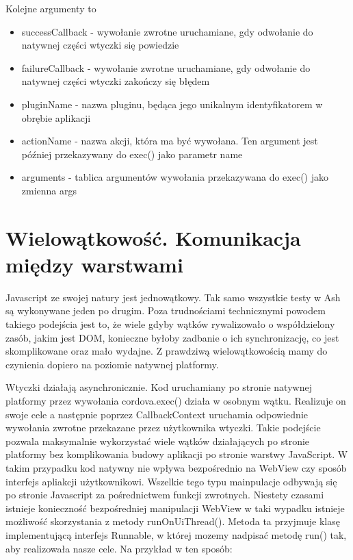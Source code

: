 \documentclass[brudnopis]{xmgr}
\begin{document}
Kolejne argumenty to
\begin{itemize}
  \item successCallback - wywołanie zwrotne uruchamiane, gdy odwołanie do natywnej części wtyczki się powiedzie
  \item failureCallback - wywołanie zwrotne uruchamiane, gdy odwołanie do natywnej części wtyczki zakończy się błędem
  \item pluginName - nazwa pluginu, będąca jego unikalnym identyfikatorem w obrębie aplikacji
  \item actionName - nazwa akcji, która ma być wywołana. Ten argument jest później przekazywany do exec() jako parametr name 
\item arguments - tablica argumentów wywołania przekazywana do exec() jako zmienna args 
\end{itemize}

\section{Wielowątkowość. Komunikacja między warstwami}

Javascript ze swojej natury jest jednowątkowy. Tak samo wszystkie testy w Ash są wykonywane jeden po drugim. Poza trudnościami technicznymi powodem takiego podejścia jest to, że wiele gdyby wątków rywalizowało o współdzielony zasób, jakim jest DOM, konieczne byłoby zadbanie o ich synchronizację, co jest skomplikowane oraz mało wydajne. Z prawdziwą wielowątkowością mamy do czynienia dopiero na poziomie natywnej platformy.

Wtyczki działają asynchronicznie. Kod uruchamiany po stronie natywnej platformy przez wywołania cordova.exec() działa w osobnym wątku. Realizuje on swoje cele a następnie poprzez CallbackContext uruchamia odpowiednie wywołania zwrotne przekazane przez użytkownika wtyczki. Takie podejście pozwala maksymalnie wykorzystać wiele wątków działających po stronie platformy bez komplikowania budowy aplikacji po stronie warstwy  JavaScript. W takim przypadku kod natywny nie wpływa bezpośrednio na WebView czy sposób interfejs apliakcji użytkownikowi. Wszelkie tego typu mainpulacje odbywają się po stronie Javascript za pośrednictwem funkcji zwrotnych. Niestety czasami istnieje konieczność bezpośredniej manipulacji WebView w taki wypadku istnieje możliwość skorzystania z metody runOnUiThread(). Metoda ta przyjmuje klasę implementującą interfejs Runnable, w której mozemy nadpisać metodę run() tak, aby realizowała nasze cele. Na przykład w ten sposób:
\end{document}

